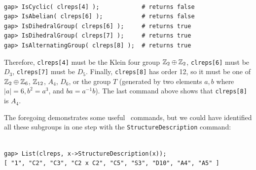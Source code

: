 {\codesize 
\begin{verbatim}

gap> IsCyclic( clreps[4] );            # returns false
gap> IsAbelian( clreps[6] );           # returns false
gap> IsDihedralGroup( clreps[6] );     # returns true
gap> IsDihedralGroup( clreps[7] );     # returns true
gap> IsAlternatingGroup( clreps[8] );  # returns true

\end{verbatim}}
\noindent Therefore, {\tt clreps[4]} must be the Klein four group $\mathbb{Z}_2 \oplus
\mathbb{Z}_2$, {\tt clreps[6]} must be $D_3$, 
{\tt clreps[7]}  must be $D_5$.  Finally, {\tt clreps[8]} has
order 12, so it must be one of $\mathbb{Z}_2 \oplus \mathbb{Z}_{6}$, $\mathbb{Z}_{12}$, $A_4$,
$D_6$, or %
the group $T$ (generated by two elements $a, b$ where $|a|=6, b^2 = a^3$, and $ba = a^{-1}b$).  
The last command above shows that {\tt clreps[8]} is $A_4$.

The foregoing demonstrates some useful \gap\ commands, but we could have
identified all these subgroups in one step with the {\tt StructureDescription} command:
{\codesize 
\begin{verbatim}

gap> List(clreps, x->StructureDescription(x));
[ "1", "C2", "C3", "C2 x C2", "C5", "S3", "D10", "A4", "A5" ]

\end{verbatim}}

